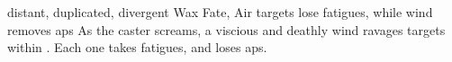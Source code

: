   {distant, duplicated, divergent}%
  {Wax}%
  {Fate, Air}%
  {}%
  { targets lose  \glspl{fatigue}, while wind removes  \glspl{ap}}%
  {
    As the caster screams, a viscious and deathly wind ravages  targets within \spellRange.
    Each one takes  \glspl{fatigue}, and loses  \glspl{ap}.
  }
